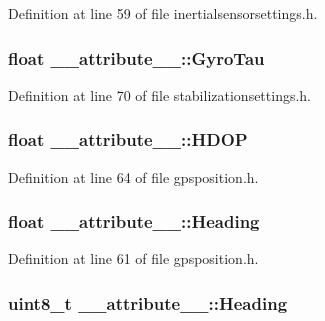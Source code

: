 \-Definition at line 59 of file inertialsensorsettings.\-h.

\hypertarget{struct____attribute_____a815ad1283db7ded0e917804a4607a812}{
\subsubsection[{\-Gyro\-Tau}]{\setlength{\rightskip}{0pt plus 5cm}float {\bf \-\_\-\-\_\-attribute\-\_\-\-\_\-\-::\-Gyro\-Tau}}}\label{struct____attribute_____a815ad1283db7ded0e917804a4607a812}


\-Definition at line 70 of file stabilizationsettings.\-h.

\hypertarget{struct____attribute_____acf74a4cdfbd52d12ca025ebd12b9b5fc}{
\subsubsection[{\-H\-D\-O\-P}]{\setlength{\rightskip}{0pt plus 5cm}float {\bf \-\_\-\-\_\-attribute\-\_\-\-\_\-\-::\-H\-D\-O\-P}}}\label{struct____attribute_____acf74a4cdfbd52d12ca025ebd12b9b5fc}


\-Definition at line 64 of file gpsposition.\-h.

\hypertarget{struct____attribute_____ac99daf96bcd9b7ed3893d53c1c78ac9d}{
\subsubsection[{\-Heading}]{\setlength{\rightskip}{0pt plus 5cm}float {\bf \-\_\-\-\_\-attribute\-\_\-\-\_\-\-::\-Heading}}}\label{struct____attribute_____ac99daf96bcd9b7ed3893d53c1c78ac9d}


\-Definition at line 61 of file gpsposition.\-h.

\hypertarget{struct____attribute_____ab13fb8103f9d07e91ba64513a490b7d2}{
\subsubsection[{\-Heading}]{\setlength{\rightskip}{0pt plus 5cm}uint8\-\_\-t {\bf \-\_\-\-\_\-attribute\-\_\-\-\_\-\-::\-Heading}}}\label{struct____attribute_____ab13fb8103f9d07e91ba64513a490b7d2}


